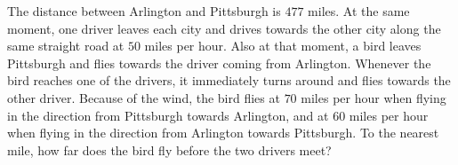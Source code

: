 The distance between Arlington and Pittsburgh is $477$ miles. At the same moment, one driver leaves each city and drives towards the other city along the same straight road at $50$ miles per hour. Also at that moment, a bird leaves Pittsburgh and flies towards the driver coming from Arlington. Whenever the bird reaches one of the drivers, it immediately turns around and flies towards the other driver. Because of the wind, the bird flies at $70$ miles per hour when flying in the direction from Pittsburgh towards Arlington, and at $60$ miles per hour when flying in the direction from Arlington towards Pittsburgh. To the nearest mile, how far does the bird fly before the two drivers meet?
